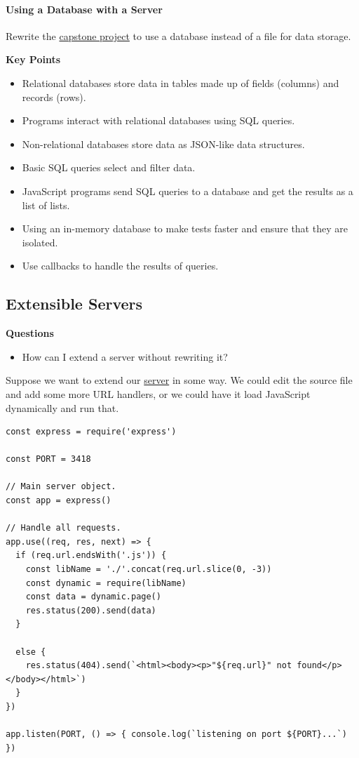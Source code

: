 \paragraph{Using a Database with a
Server}\label{using-a-database-with-a-server}

Rewrite the \protect\hyperlink{s:capstone}{capstone project} to use a
database instead of a file for data storage.

\textbf{Key Points}

\begin{itemize}
\tightlist
\item
  Relational databases store data in tables made up of fields (columns)
  and records (rows).
\item
  Programs interact with relational databases using SQL queries.
\item
  Non-relational databases store data as JSON-like data structures.
\item
  Basic SQL queries select and filter data.
\item
  JavaScript programs send SQL queries to a database and get the results
  as a list of lists.
\item
  Using an in-memory database to make tests faster and ensure that they
  are isolated.
\item
  Use callbacks to handle the results of queries.
\end{itemize}

\subsection{Extensible Servers}\label{s:extensible}

\textbf{Questions}

\begin{itemize}
\tightlist
\item
  How can I extend a server without rewriting it?
\end{itemize}

Suppose we want to extend our \protect\hyperlink{s:server}{server} in
some way. We could edit the source file and add some more URL handlers,
or we could have it load JavaScript dynamically and run that.

\begin{verbatim}
const express = require('express')

const PORT = 3418

// Main server object.
const app = express()

// Handle all requests.
app.use((req, res, next) => {
  if (req.url.endsWith('.js')) {
    const libName = './'.concat(req.url.slice(0, -3))
    const dynamic = require(libName)
    const data = dynamic.page()
    res.status(200).send(data)
  }

  else {
    res.status(404).send(`<html><body><p>"${req.url}" not found</p></body></html>`)
  }
})

app.listen(PORT, () => { console.log(`listening on port ${PORT}...`) })
\end{verbatim}

